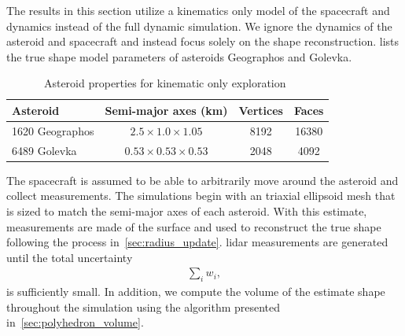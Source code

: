The results in this section utilize a kinematics only model of the spacecraft and dynamics instead of the full dynamic simulation. 
We ignore the dynamics of the asteroid and spacecraft and instead focus solely on the shape reconstruction.
 lists the true shape model parameters of asteroids Geographos and Golevka.
\begin{table}[htbp]
    \centering
    \begin{tabular}{lccc}
        \toprule
        Asteroid & Semi-major axes (\si{\kilo\meter}) & Vertices & Faces\\
        \midrule
        \num{1620} Geographos & \( 2.5 \times 1.0 \times 1.05 \) & \num{8192} & \num{16380}  \\
        \num{6489} Golevka & \( 0.53 \times 0.53 \times 0.53 \)  & \num{2048} & \num{4092} \\
        \bottomrule
    \end{tabular} 
    \caption{Asteroid properties for kinematic only exploration~\label{tab:kinematic_asteroids}}
\end{table}
The spacecraft is assumed to be able to arbitrarily move around the asteroid and collect measurements.
The simulations begin with an triaxial ellipsoid mesh that is sized to match the semi-major axes of each asteroid.
With this estimate, measurements are made of the surface and used to reconstruct the true shape following the process in~\cref{sec:radius_update}.
\Gls{lidar} measurements are generated until the total uncertainty
\begin{align*}
    \sum_i w_i,
\end{align*}
is sufficiently small.
In addition, we compute the volume of the estimate shape throughout the simulation using the algorithm presented in~\cref{sec:polyhedron_volume}.

